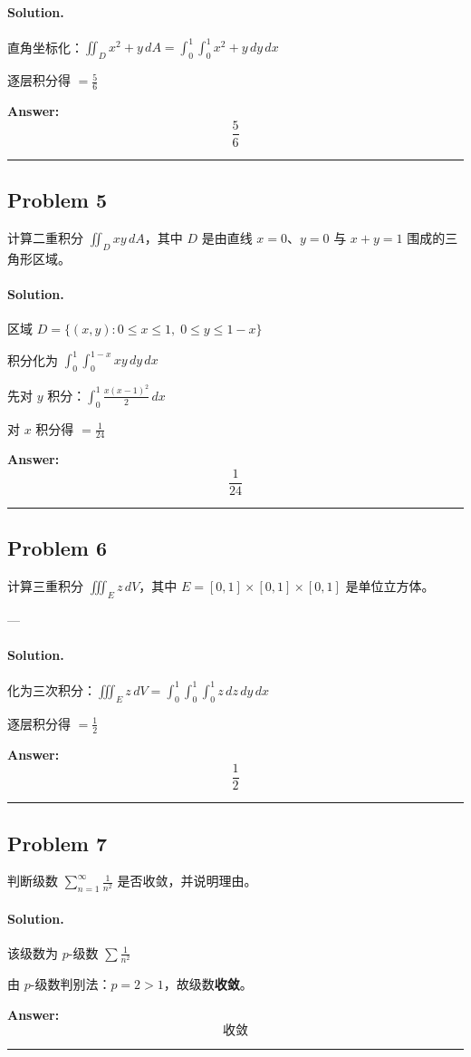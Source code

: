 \documentclass[12pt, a4paper]{article}
\newcommand{\problem}[1]{\subsection*{Problem #1}}
\newcommand{\solution}{\paragraph{Solution.}}
\begin{document}
\solution

直角坐标化：$\iint_D x^{2} + y\,dA=\int_{0}^{1}\int_{0}^{1}x^{2} + y\,dy\,dx$

逐层积分得 $=\frac{5}{6}$

\textbf{Answer:}
\[\boxed{\frac{5}{6}}\]

\vspace{1em}
\hrule
\vspace{1em}

\problem{5}

计算二重积分 $\iint_D xy\,dA$，其中 $D$ 是由直线 $x=0$、$y=0$ 与 $x+y=1$ 围成的三角形区域。

\solution

区域 $D=\{(x,y):0\le x\le 1,\;0\le y\le 1-x\}$

积分化为 $\int_0^1\int_0^{1-x}x y\,dy\,dx$

先对 $y$ 积分：$\int_0^1 \frac{x \left(x - 1\right)^{2}}{2}\,dx$

对 $x$ 积分得 $=\frac{1}{24}$

\textbf{Answer:}
\[\boxed{\frac{1}{24}}\]

\vspace{1em}
\hrule
\vspace{1em}

\problem{6}

计算三重积分 $\iiint_E z\,dV$，其中 $E=[0,1]\times[0,1]\times[0,1]$ 是单位立方体。

---

\solution

化为三次积分：$\iiint_E z\,dV=\int_{0}^{1}\int_{0}^{1}\int_{0}^{1}z\,dz\,dy\,dx$

逐层积分得 $=\frac{1}{2}$

\textbf{Answer:}
\[\boxed{\frac{1}{2}}\]

\vspace{1em}
\hrule
\vspace{1em}

\problem{7}

判断级数 $\sum_{n=1}^{\infty} \frac{1}{n^2}$ 是否收敛，并说明理由。

\solution

该级数为 $p$-级数 $\sum\frac{1}{n^{2}}$

由 $p$-级数判别法：$p=2>1$，故级数\textbf{收敛}。

\textbf{Answer:}
\[\boxed{收敛}\]

\vspace{1em}
\hrule
\vspace{1em}
\end{document}
